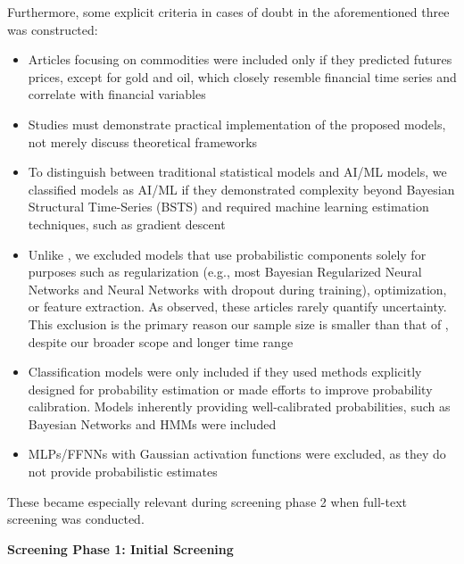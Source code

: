 Furthermore, some explicit criteria in cases of doubt in the aforementioned three was constructed:
\begin{itemize}
    \item Articles focusing on commodities were included only if they predicted futures prices, except for gold and oil, which closely resemble financial time series and correlate with financial variables \parencite{Gokmenoglu2015}
    \item Studies must demonstrate practical implementation of the proposed models, not merely discuss theoretical frameworks
    \item To distinguish between traditional statistical models and AI/ML models, we classified models as AI/ML if they demonstrated complexity beyond Bayesian Structural Time-Series (BSTS) and required machine learning estimation techniques, such as gradient descent
    \item Unlike \textcite{Blasco_et_al_2024}, we excluded models that use probabilistic components solely for purposes such as regularization (e.g., most Bayesian Regularized Neural Networks and Neural Networks with dropout during training), optimization, or feature extraction. As \textcite{Blasco_et_al_2024} observed, these articles rarely quantify uncertainty. This exclusion is the primary reason our sample size is smaller than that of \textcite{Blasco_et_al_2024}, despite our broader scope and longer time range
    \item Classification models were only included if they used methods explicitly designed for probability estimation or made efforts to improve probability calibration. Models inherently providing well-calibrated probabilities, such as Bayesian Networks and HMMs were included
    \item MLPs/FFNNs with Gaussian activation functions were excluded, as they do not provide probabilistic estimates
\end{itemize}
These became especially relevant during screening phase 2 when full-text screening was conducted. 

\textbf{Screening Phase 1: Initial Screening}\nopagebreak

